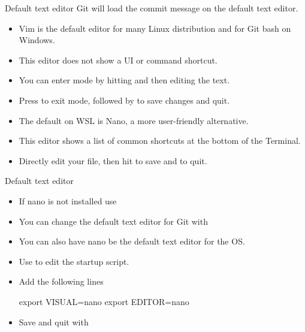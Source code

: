\begin{frame}[fragile]{Default text editor}
  Git will load the commit message on the default text editor.


  \begin{itemize}[<+->]
      \item Vim is the default editor for many Linux distribution and for Git bash on Windows.
      \item This editor does not show a UI or command shortcut.
      \item You can enter  mode by hitting  and then editing the text.
      \item Press  to exit  mode, followed by  to save changes and quit.
  \end{itemize}


  \begin{itemize}[<+->]
      \item The default on WSL is Nano, a more user-friendly alternative.
      \item This editor shows a list of common shortcuts at the bottom of the Terminal.
      \item Directly edit your file, then hit  to save and  to quit. 
  \end{itemize}
\end{frame}

\begin{frame}[fragile]{Default text editor \insertcontinuationtext}
  \begin{itemize}[<+->]
      \item If nano is not installed use 
      \item You can change the default text editor for Git with 
      \item You can also have nano be the default text editor for the OS.
      \item Use  to edit the startup script.
      \item Add the following lines
      \begin{codeblock}
  export VISUAL=nano
  export EDITOR=nano
      \end{codeblock}
      \item Save and quit with  
  \end{itemize}
\end{frame}

